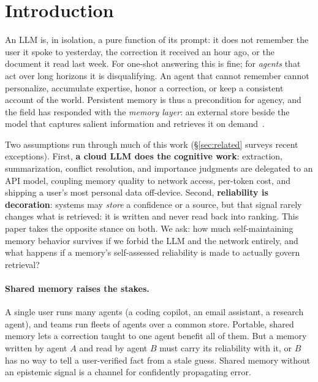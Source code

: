 \documentclass[11pt]{article}
\theoremstyle{definition}
\begin{document}
\section{Introduction}
An LLM is, in isolation, a pure function of its prompt: it does not remember the
user it spoke to yesterday, the correction it received an hour ago, or the
document it read last week. For one-shot answering this is fine; for
\emph{agents} that act over long horizons it is disqualifying. An agent that
cannot remember cannot personalize, accumulate expertise, honor a correction, or
keep a consistent account of the world. Persistent memory is thus a precondition
for agency, and the field has responded with the \emph{memory layer}: an external
store beside the model that captures salient information and retrieves it on
demand~\cite{memgpt,mem0,zep,amem,memorybank,generativeagents}.

Two assumptions run through much of this work (\S\ref{sec:related} surveys
recent exceptions). First, \textbf{a cloud LLM
does the cognitive work}: extraction, summarization, conflict resolution, and
importance judgments are delegated to an API model, coupling memory quality to
network access, per-token cost, and shipping a user's most personal data
off-device. Second, \textbf{reliability is decoration}: systems may \emph{store}
a confidence or a source, but that signal rarely changes what is retrieved: it
is written and never read back into ranking. This paper takes the opposite
stance on both. We ask: how much self-maintaining memory behavior survives if we
forbid the LLM and the network entirely, and what happens if a memory's
self-assessed reliability is made to actually govern retrieval?

\paragraph{Shared memory raises the stakes.}
A single user runs many agents (a coding copilot, an email assistant, a research
agent), and teams run fleets of agents over a common store. Portable, shared
memory lets a correction taught to one agent benefit all of them. But a memory
written by agent $A$ and read by agent $B$ must carry its reliability with it,
or $B$ has no way to tell a user-verified fact from a stale guess. Shared memory
without an epistemic signal is a channel for confidently propagating error.
\end{document}
